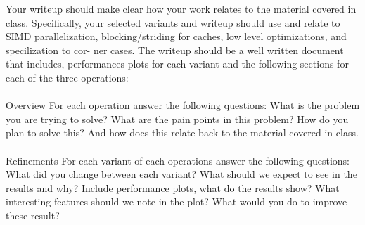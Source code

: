 \documentclass{article}
\begin{document}
Your writeup should make clear how your work relates to the material covered in class. Specifically, your selected variants and writeup should use and relate to SIMD
parallelization, blocking/striding for caches, low level optimizations, and specilization to cor-
ner cases. The writeup should be a well written document that includes, performances plots
for each variant and the following sections for each of the three operations:
\\ \\

Overview For each operation answer the following questions: What is the problem you are
trying to solve? What are the pain points in this problem? How do you plan to solve
this? And how does this relate back to the material covered in class.
\\ \\

Refinements For each variant of each operations answer the following questions: What did
you change between each variant? What should we expect to see in the results and why?
Include performance plots, what do the results show? What interesting features should
we note in the plot? What would you do to improve these result?
\end{document}
